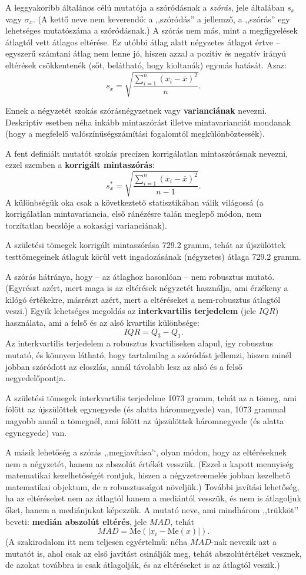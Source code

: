 \documentclass[
]{book}
\begin{document}
A leggyakoribb általános célú mutatója a szóródásnak a \emph{szórás}, jele általában \(s_x\) vagy \(\sigma_x\). (A kettő neve nem keverendő: a ,,szóródás'' a jellemző, a ,,szórás'' egy lehetséges mutatószáma a szóródásnak.) A szórás nem más, mint a megfigyelések átlagtól vett átlagos eltérése. Ez utóbbi átlag alatt négyzetes átlagot értve -- egyszerű számtani átlag nem lenne jó, hiszen azzal a pozitív és negatív irányú eltérések csökkentenék (sőt, belátható, hogy kioltanák) egymás hatását. Azaz:
\[
    s_x=\sqrt{\frac{\sum_{i=1}^n \left(x_i-\overline{x}\right)^2}{n}}.
\]

Ennek a négyzetét szokás szórásnégyzetnek vagy \textbf{varianciának} nevezni. Deskriptív esetben néha inkább mintaszórást illetve mintavarianciát mondanak (hogy a megfelelő valószínűségszámítási fogalomtól megkülönböztessék).

A fent definiált mutatót szokás precízen korrigálatlan mintaszórásnak nevezni, ezzel szemben a \textbf{korrigált mintaszórás}:
\[
    s_x^{\ast}=\sqrt{\frac{\sum_{i=1}^n \left(x_i-\overline{x}\right)^2}{n-1}}.
\]
A különbségük oka csak a következtető statisztikában válik világossá (a korrigálatlan mintavariancia, első ránézésre talán meglepő módon, nem torzítatlan becslője a sokasági varianciának).

A születési tömegek korrigált mintaszórása 729.2 gramm, tehát az újszülöttek testtömegeinek átlaguk körül vett ingadozásának (négyzetes) átlaga 729.2 gramm.

A szórás hátránya, hogy -- az átlaghoz hasonlóan -- nem robusztus mutató. (Egyrészt azért, mert maga is az eltérések négyzetét használja, ami érzékeny a kilógó értékekre, másrészt azért, mert a eltéréseket a nem-robusztus átlagtól veszi.) Egyik lehetséges megoldás az \textbf{interkvartilis terjedelem} (jele \(IQR\)) használata, ami a felső és az alsó kvartilis különbsége:
\[
    IQR=Q_3-Q_1.
\]
Az interkvartilis terjedelem a robusztus kvartiliseken alapul, így robusztus mutató, és könnyen látható, hogy tartalmilag a szóródást jellemzi, hiszen minél jobban szóródott az eloszlás, annál távolabb lesz az alsó és a felső negyedelőpontja.

A születési tömegek interkvartilis terjedelme 1073 gramm, tehát az a tömeg, ami fölött az újszülöttek egynegyede (és alatta háromnegyede) van, 1073 grammal nagyobb annál a tömegnél, ami fölött az újszülöttek háromnegyede (és alatta egynegyede) van.

A másik lehetőség a szórás ,,megjavítása'`, olyan módon, hogy az eltéréseknek nem a négyzetét, hanem az abszolút értékét vesszük. (Ezzel a kapott mennyiség matematikai kezelhetőségét rontjuk, hiszen a négyzetreemelés jobban kezelhető matematikai objektum, de a robusztusságot növeljük.) További javítási lehetőség, ha az eltéréseket nem az átlagtól hanem a mediántól vesszük, és nem is átlagoljuk őket, hanem a mediánjukat képezzük. A mutató neve, ami mindhárom ,,trükköt'' beveti: \textbf{medián abszolút eltérés}, jele \(MAD\), tehát
\[
    MAD=\mathrm{Me}\left(\left|x_i-\mathrm{Me}\left(x\right)\right|\right).
\]
(A szakirodalom itt nem teljesen egyértelmű: néha \(MAD\)-nak nevezik azt a mutatót is, ahol csak az első javítást csinálják meg, tehát abszolútértéket vesznek, de azokat továbbra is csak átlagolják, és az eltéréseket is az átlagtól veszik.)
\end{document}
